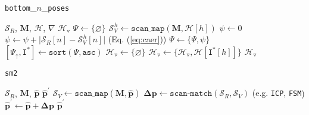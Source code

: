 \begin{algorithm}
  \caption{\texttt{bottom}\_$n$\_\texttt{poses}}
  \begin{spacing}{1.2}
  \begin{algorithmic}[1]
    \REQUIRE $\mathcal{S}_R$, $\bm{M}$, $\mathcal{H}$, $\nabla$
    \ENSURE $\mathcal{H}_{\triangledown}$
    \STATE $\Psi \leftarrow \{\varnothing \}$
      \STATE $\mathcal{S}_V^{\hspace{1pt} h} \leftarrow \texttt{scan\_map}(\bm{M}, \mathcal{H}[h])$
      \STATE $\psi \leftarrow 0$
        \STATE $\psi \leftarrow \psi + \big|\mathcal{S}_R[n]-\mathcal{S}_V^{\hspace{1pt} h}[n]\big|$ \hfill {\small (Eq. (\ref{eq:caer})})
      \ENDFOR
      \STATE $\Psi \leftarrow \{\Psi, \psi\}$
    \ENDFOR
    \STATE $[\Psi_{\uparrow}, \texttt{I}^{\ast}] \leftarrow \texttt{sort}(\Psi, \texttt{asc})$
    \STATE $\mathcal{H}_{\triangledown} \leftarrow \{\varnothing \}$
      \STATE $\mathcal{H}_{\triangledown} \leftarrow \{\mathcal{H}_{\triangledown}, \mathcal{H}[\texttt{I}^{\ast}[h]]\}$
    \ENDFOR
    \RETURN $\mathcal{H}_{\triangledown}$
  \end{algorithmic}
  \end{spacing}
  \label{alg:algorithm_bottom_n}
\end{algorithm}

\begin{algorithm}
  \caption{\texttt{sm2}}
  \begin{spacing}{1.2}
  \begin{algorithmic}[1]
    \REQUIRE $\mathcal{S}_R$, $\bm{M}$, $\hat{\bm{p}}$
    \ENSURE $\hat{\bm{p}}^\prime$
    \STATE $\mathcal{S}_V \leftarrow \texttt{scan\_map}(\bm{M}, \hat{\bm{p}})$
    \STATE $\bm{\Delta p} \leftarrow \texttt{scan-match}(\mathcal{S}_R,\mathcal{S}_V)$ \hfill {\small (e.g. \texttt{ICP}\cite{kissicp}, \texttt{FSM}\cite{fsm}})
    \STATE $\hat{\bm{p}}^\prime \leftarrow \hat{\bm{p}} + \bm{\Delta p}$
    \RETURN $\hat{\bm{p}}^\prime$
  \end{algorithmic}
  \end{spacing}
  \label{alg:algorithm_sm2}
\end{algorithm}

\lipsum[0-1]
